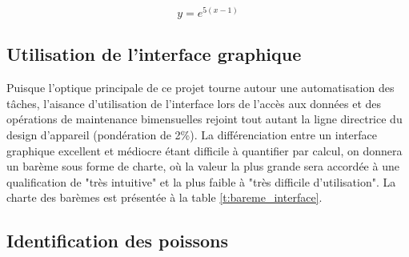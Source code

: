 \begin{equation}
    y = e^{5(x-1)}
    \label{eq:bareme_precision}
\end{equation}

\subsection{Utilisation de l'interface graphique}

\begin{table}
   \footnotesize
   \centering
   \caption{Évaluation du barème de l'interface graphique}
   \label{t:bareme_interface}
\end{table}

Puisque l'optique principale de ce projet tourne autour une automatisation des tâches, l'aisance d'utilisation de l'interface lors de l'accès aux données et des opérations de maintenance bimensuelles rejoint tout autant la ligne directrice du design d'appareil (pondération de 2\%). La différenciation entre un interface graphique excellent et médiocre étant difficile à quantifier par calcul, on donnera un barème sous forme de charte, où la valeur la plus grande sera accordée à une qualification de "très intuitive" et la plus faible à "très difficile d'utilisation". La charte des barèmes est présentée à la table \ref{t:bareme_interface}. 

\subsection{Identification des poissons}

